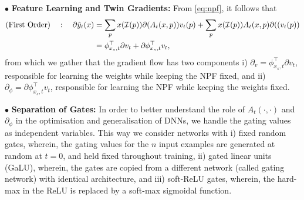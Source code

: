 \documentclass{article}
\begin{document}
$\bullet$ \textbf{Feature Learning and Twin Gradients:} From \eqref{eq:npf}, it follows that
\begin{align}\label{eq:npfgrad}
\text{(First Order)}\quad: \quad \partial \hat{y}_t(x)&=\sum_{p}x(\mathcal{I}(p)) \partial(A_t(x,p)) v_t(p)+ \sum_{p}x(\mathcal{I}(p)) A_t(x,p) \partial((v_t(p))\nonumber\\
&=\phi^\top_{x_s,t} {\partial} v_t + {\partial} \phi^\top_{x_s,t} v_t,
\end{align}
from which we gather that the gradient flow has two components i) $\partial_{v}= \phi^\top_{x_s,t} {\partial} v_t$, responsible for learning the weights while keeping the NPF fixed, and ii) $ \partial_{\phi}={\partial} \phi^\top_{x_s,t} v_t$, responsible for learning the NPF while keeping the weights fixed. 
\begin{comment}
\textbf{ReLU artefact or NTF vs NPF:} Note that the left-hand side of \eqref{eq:npfgrad} is the neural tangent feature. We note that, in the case when $A_t(x,p)\in\{0,1\}$ (such as in DNN with ReLU activations)  $\partial_{\phi}=0$, and hence is not accounted for in the SGD update as well as the analysis. However, due to the SGD update, the gating value changes during training, and consequently the activations, the NPF, the NPK change during training (see the experiments in \Cref{sec:generalisation}). We believe the change of activations is key for generalisation, a fact which can explain the gap in generalisation performance \cite{} between the DNNs and the pure-kernel methods based on their static NTK counterparts.
\end{comment}

$\bullet$ \textbf{Separation of Gates:} In order to better understand the role of $A_t(\cdot,\cdot)$ and $\partial_{\phi}$ in the optimisation and generalisation of DNNs, we handle the gating values as independent variables. This way we consider networks with i) fixed random gates, wherein, the gating values for the $n$ input examples are generated at random at $t=0$, and held fixed throughout training, ii) gated linear units (GaLU), wherein, the gates are copied from a different network (called gating network) with identical architecture, and iii) soft-ReLU gates, wherein, the hard-max in the ReLU is replaced by a soft-max sigmoidal function.
\end{document}
